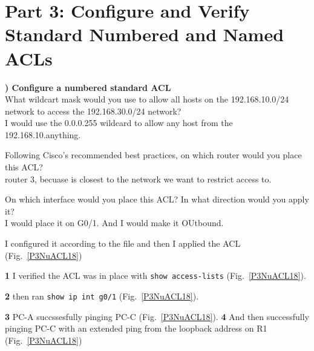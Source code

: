 \documentclass{report}
\newcommand{\mysection}[1]{\section*{#1}}
\newcommand{\mysubsection}[2]{\textbf{\romannumeral #1) #2}}
\begin{document}
\clearpage

\mysection{\textbf{Part 3: Configure and Verify Standard Numbered and Named ACLs}}

\mysubsection{1}{Configure a numbered standard ACL}\\
What wildcart mask would you use to allow all hosts on the 192.168.10.0/24
network to access the 192.168.30.0/24 network?\\
I would use the 0.0.0.255 wildcard to allow any host from the
192.168.10.anything.


Following Cisco's recommended best practices, on which router would you place
this ACL?\\
router 3, becuase is closest to the network we want to restrict access to.

On which interface would you place this ACL? In what direction would you apply it?\\

I would place it on G0/1. And I would make it OUtbound.

I configured it according to the file and then I applied the ACL (Fig.~\ref{P3NuACL18})

{\bf{1}}
I verified the ACL was in place with
{\scriptsize{\verb$show access-lists$}\normalsize}
(Fig.~\ref{P3NuACL18}).

{\bf{2}}
then ran
{\scriptsize{\verb$show ip int g0/1$}\normalsize}
(Fig.~\ref{P3NuACL18}).

{\bf{3}} PC-A succssesfully pinging PC-C (Fig.~\ref{P3NuACL18}).
{\bf{4}} And then successfully pinging PC-C with an extended ping from the loopback address on R1
(Fig.~\ref{P3NuACL18})
\end{document}
